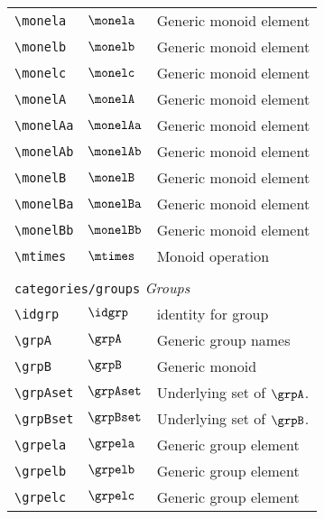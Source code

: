 \begin{longtable}{lll}
 {\color[rgb]{0.5,0.5,0.5}\texttt{\textbackslash monela}} & $\monela$ &  Generic monoid element\\ 
 {\color[rgb]{0.5,0.5,0.5}\texttt{\textbackslash monelb}} & $\monelb$ &  Generic monoid element\\ 
 {\color[rgb]{0.5,0.5,0.5}\texttt{\textbackslash monelc}} & $\monelc$ &  Generic monoid element\\ 
 {\color[rgb]{0.5,0.5,0.5}\texttt{\textbackslash monelA}} & $\monelA$ &  Generic monoid element\\ 
 {\color[rgb]{0.5,0.5,0.5}\texttt{\textbackslash monelAa}} & $\monelAa$ &  Generic monoid element\\ 
 {\color[rgb]{0.5,0.5,0.5}\texttt{\textbackslash monelAb}} & $\monelAb$ &  Generic monoid element\\ 
 {\color[rgb]{0.5,0.5,0.5}\texttt{\textbackslash monelB}} & $\monelB$ &  Generic monoid element\\ 
 {\color[rgb]{0.5,0.5,0.5}\texttt{\textbackslash monelBa}} & $\monelBa$ &  Generic monoid element\\ 
 {\color[rgb]{0.5,0.5,0.5}\texttt{\textbackslash monelBb}} & $\monelBb$ &  Generic monoid element\\ 
 {\color[rgb]{0.5,0.5,0.5}\texttt{\textbackslash mtimes}} & $\mtimes$ &  Monoid operation\\ 
  &  & \\ 
 \multicolumn{3}{l}{{\color[rgb]{0.5,0.5,0.5}\texttt{categories/groups}} \emph{Groups}}\\ 
 \hline
{\color[rgb]{0.5,0.5,0.5}\texttt{\textbackslash idgrp}} & $\idgrp$ &  identity for group\\ 
 {\color[rgb]{0.5,0.5,0.5}\texttt{\textbackslash grpA}} & $\grpA$ &  Generic group names\\ 
 {\color[rgb]{0.5,0.5,0.5}\texttt{\textbackslash grpB}} & $\grpB$ &  Generic monoid\\ 
 {\color[rgb]{0.5,0.5,0.5}\texttt{\textbackslash grpAset}} & $\grpAset$ &  Underlying set of $\grpA$.\\ 
 {\color[rgb]{0.5,0.5,0.5}\texttt{\textbackslash grpBset}} & $\grpBset$ &  Underlying set of $\grpB$.\\ 
 {\color[rgb]{0.5,0.5,0.5}\texttt{\textbackslash grpela}} & $\grpela$ &  Generic group element\\ 
 {\color[rgb]{0.5,0.5,0.5}\texttt{\textbackslash grpelb}} & $\grpelb$ &  Generic group element\\ 
 {\color[rgb]{0.5,0.5,0.5}\texttt{\textbackslash grpelc}} & $\grpelc$ &  Generic group element\\ 

\end{longtable}
